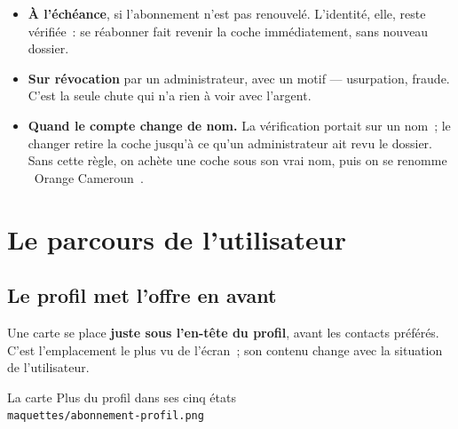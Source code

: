 \begin{itemize}[leftmargin=1.4em]
  \item \textbf{À l'échéance}, si l'abonnement n'est pas renouvelé. L'identité, elle, reste
        vérifiée~: se réabonner fait revenir la coche immédiatement, sans nouveau dossier.
  \item \textbf{Sur révocation} par un administrateur, avec un motif --- usurpation, fraude.
        C'est la seule chute qui n'a rien à voir avec l'argent.
  \item \textbf{Quand le compte change de nom.} La vérification portait sur un nom~; le
        changer retire la coche jusqu'à ce qu'un administrateur ait revu le dossier. Sans
        cette règle, on achète une coche sous son vrai nom, puis on se renomme
        \guillemotleft~Orange Cameroun~\guillemotright.
\end{itemize}

\chapter{Le parcours de l'utilisateur}

\section{Le profil met l'offre en avant}

Une carte se place \textbf{juste sous l'en-tête du profil}, avant les contacts préférés. C'est
l'emplacement le plus vu de l'écran~; son contenu change avec la situation de l'utilisateur.

\begin{center}
    {La carte Plus du profil dans ses cinq états\\
     \texttt{maquettes/abonnement-profil.png}}
\end{center}


